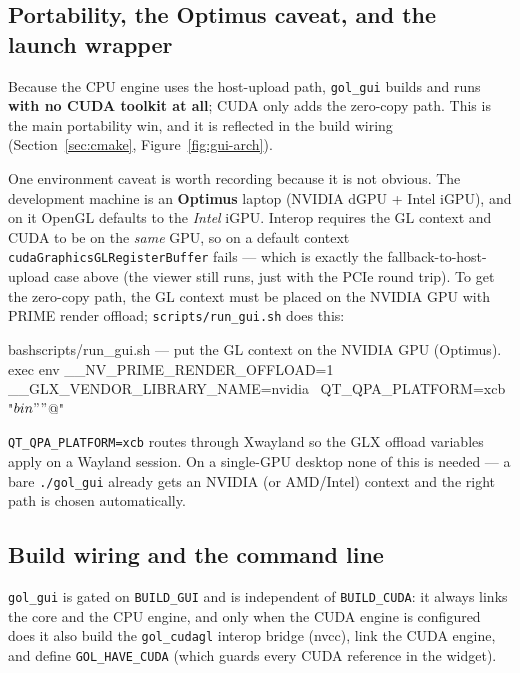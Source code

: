 \documentclass[
	english,
	letterpaper, oneside
]{article}
\begin{document}
\subsection{Portability, the Optimus caveat, and the launch wrapper}
\label{sec:gui-portability}

Because the CPU engine uses the host-upload path, \texttt{gol\_gui} builds and runs
\textbf{with no CUDA toolkit at all}; CUDA only adds the zero-copy path. This is
the main portability win, and it is reflected in the build wiring
(Section~\ref{sec:cmake}, Figure~\ref{fig:gui-arch}).

One environment caveat is worth recording because it is not obvious. The
development machine is an \textbf{Optimus} laptop (NVIDIA dGPU + Intel iGPU), and
on it OpenGL defaults to the \emph{Intel} iGPU. Interop requires the GL context
and CUDA to be on the \emph{same} GPU, so on a default context
\texttt{cudaGraphicsGLRegisterBuffer} fails --- which is exactly the
fallback-to-host-upload case above (the viewer still runs, just with the PCIe
round trip). To get the zero-copy path, the GL context must be placed on the
NVIDIA GPU with PRIME render offload; \texttt{scripts/run\_gui.sh} does this:

\begin{sourcecode}{bash}{scripts/run\_gui.sh --- put the GL context on the NVIDIA GPU (Optimus).}
exec env __NV_PRIME_RENDER_OFFLOAD=1 __GLX_VENDOR_LIBRARY_NAME=nvidia \
         QT_QPA_PLATFORM=xcb "$bin" "$@"
\end{sourcecode}

\texttt{QT\_QPA\_PLATFORM=xcb} routes through Xwayland so the GLX offload variables
apply on a Wayland session. On a single-GPU desktop none of this is needed --- a
bare \texttt{./gol\_gui} already gets an NVIDIA (or AMD/Intel) context and the
right path is chosen automatically.

\subsection{Build wiring and the command line}
\label{sec:gui-build}

\texttt{gol\_gui} is gated on \texttt{BUILD\_GUI} and is independent of
\texttt{BUILD\_CUDA}: it always links the core and the CPU engine, and only when
the CUDA engine is configured does it also build the \texttt{gol\_cudagl} interop
bridge (nvcc), link the CUDA engine, and define \texttt{GOL\_HAVE\_CUDA} (which
guards every CUDA reference in the widget).
\end{document}
